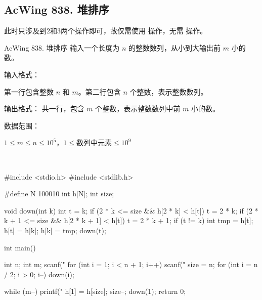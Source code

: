 \subsection{AcWing 838. 堆排序}
此时只涉及到2和3两个操作即可，故仅需使用  操作，无需  操作。

\begin{titledbox}{AcWing 838. 堆排序}
    输入一个长度为 $n$ 的整数数列，从小到大输出前 $m$ 小的数。

    输入格式：

    第一行包含整数 $n$ 和 $m$。第二行包含 $n$ 个整数，表示整数数列。

    输出格式：
    共一行，包含 $m$ 个整数，表示整数数列中前 $m$ 小的数。

    数据范围：

    $1 \le m \le n \le 10^5$，$1 \le 数列中元素 \le 10^9$

    \begin{inputblock}
         \\
    \end{inputblock}
    \begin{outputblock}
    \end{outputblock}

\end{titledbox}

\begin{mycpptwocol}[堆排序]
    #include <stdio.h>
    #include <stdlib.h>

    #define N 100010
    int h[N];
    int size;

    void down(int k) {
        int t = k;
        if (2 * k <= size && h[2 * k] < h[t]) {
            t = 2 * k;
        }
        if (2 * k + 1 <= size && h[2 * k + 1] < h[t]) {
            t = 2 * k + 1;
        }
        if (t != k) {
            int tmp = h[t];
            h[t] = h[k];
            h[k] = tmp;
            down(t);
        }
    }

    int main() {
        int n;
        int m;
        scanf("%
        for (int i = 1; i < n + 1; i++) {
            scanf("%
        }
        size = n;
        for (int i = n / 2; i > 0; i--) {
            down(i);
        }

        while (m--) {
            printf("%
            h[1] = h[size];
            size--;
            down(1);
        }
        return 0;
    }
\end{mycpptwocol}

